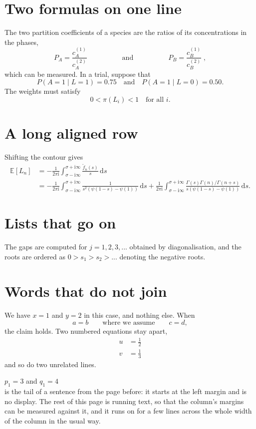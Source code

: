 \documentclass[11pt]{article}
\begin{document}
\section*{Two formulas on one line}

The two partition coefficients of a species are the ratios of its concentrations in the
phases,
\begin{equation}
  P_A = \frac{c_A^{(1)}}{c_A^{(2)}} \hspace{5em} \text{and} \hspace{5em}
  P_B = \frac{c_B^{(1)}}{c_B^{(2)}} \;,
\end{equation}
which can be measured. In a trial, suppose that
\[
  P(A = 1 \mid L = 1) = 0.75 \quad \text{and} \quad P(A = 1 \mid L = 0) = 0.50.
\]
The weights must satisfy
\[
  0 < \pi(L_i) < 1 \quad \text{for all } i.
\]

\section*{A long aligned row}

Shifting the contour gives
\begin{align*}
  \mathbb{E}[L_n] &= -\frac{1}{2\pi \mathrm{i}} \int_{\sigma-\mathrm{i}\infty}^{\sigma+\mathrm{i}\infty}
    \frac{\widetilde{f}_n(s)}{s}\,\mathrm{d}s \\
  &= -\frac{1}{2\pi \mathrm{i}} \int_{\sigma-\mathrm{i}\infty}^{\sigma+\mathrm{i}\infty}
    \frac{1}{s^2(\psi(1-s)-\psi(1))}\,\mathrm{d}s
    + \frac{1}{2\pi \mathrm{i}} \int_{\sigma-\mathrm{i}\infty}^{\sigma+\mathrm{i}\infty}
    \frac{\Gamma(s)\Gamma(n)/\Gamma(n+s)}{s(\psi(1-s)-\psi(1))}\,\mathrm{d}s.
\end{align*}

\section*{Lists that go on}

The gaps are computed for $j = 1,2,3,...$ obtained by diagonalisation, and the roots
are ordered as $0 > s_1 > s_2 > ...$ denoting the negative roots.

\section*{Words that do not join}

We have $x = 1$ and $y = 2$ in this case, and nothing else. When
\[
  a = b \qquad \text{where we assume} \qquad c = d,
\]
the claim holds. Two numbered equations stay apart,
\begin{align}
  u &= \frac{1}{2} \\
  v &= \frac{1}{3}
\end{align}
and so do two unrelated lines.

\newpage
\noindent $p_1 = 3$ and $q_1 = 4$\\
is the tail of a sentence from the page before: it starts at the left margin and is no display.
The rest of this page is running text, so that the column's margins can be measured against
it, and it runs on for a few lines across the whole width of the column in the usual way.
\end{document}

